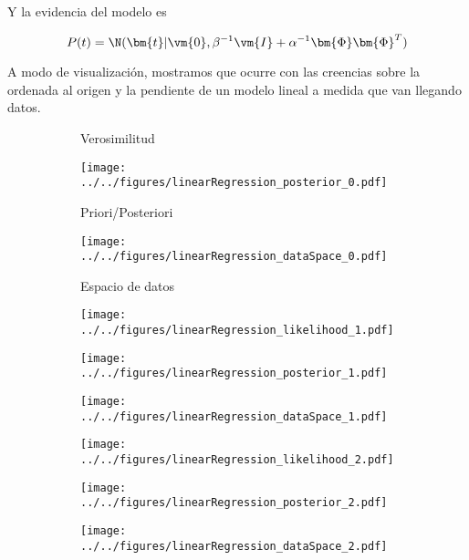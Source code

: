\documentclass[a4paper,10pt]{article}
\begin{document}
Y la evidencia del modelo es

\begin{equation}
 P(t) = \N(\bm{t}| \vm{0}, \beta^{-1} \vm{I} + \alpha^{-1}\bm{\Phi}\bm{\Phi}^T  )
\end{equation}

A modo de visualizaci\'on, mostramos que ocurre con las creencias sobre la ordenada al origen y la pendiente de un modelo lineal a medida que van llegando datos.

 \begin{figure}[H]
\begin{subfigure}[t]{0.32\textwidth} 
\caption*{Verosimilitud} 
\end{subfigure}
\begin{subfigure}[t]{0.32\textwidth}
\caption*{Priori/Posteriori} 
\texttt{[image: ../../figures/linearRegression\_posterior\_0.pdf]} 
\end{subfigure}
\begin{subfigure}[t]{0.32\textwidth}
\caption*{Espacio de datos} 
\texttt{[image: ../../figures/linearRegression\_dataSpace\_0.pdf]} 
\end{subfigure}

\begin{subfigure}[c]{0.32\textwidth}
\texttt{[image: ../../figures/linearRegression\_likelihood\_1.pdf]} 
\end{subfigure}
\begin{subfigure}[c]{0.32\textwidth}
\texttt{[image: ../../figures/linearRegression\_posterior\_1.pdf]} 
\end{subfigure}
\begin{subfigure}[c]{0.32\textwidth}
\texttt{[image: ../../figures/linearRegression\_dataSpace\_1.pdf]} 
\end{subfigure}

\begin{subfigure}[c]{0.32\textwidth}
\texttt{[image: ../../figures/linearRegression\_likelihood\_2.pdf]} 
\end{subfigure}
\begin{subfigure}[c]{0.32\textwidth}
\texttt{[image: ../../figures/linearRegression\_posterior\_2.pdf]} 
\end{subfigure}
\begin{subfigure}[c]{0.32\textwidth}
\texttt{[image: ../../figures/linearRegression\_dataSpace\_2.pdf]} 
\end{subfigure}
\end{figure}
\end{document}
